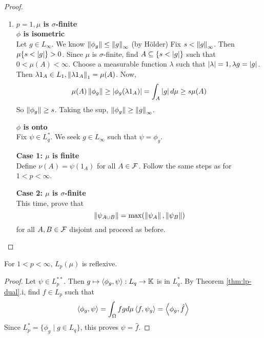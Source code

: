 \documentclass{article}
\begin{document}
\begin{proof}
\begin{enumerate}
    {\bf Case 3: General $n$} \\
    First observe that, for $f \in L_p(\mu)$, $\{f \ne 0\}$ is $\sigma$-finite. Indeed,
    $$\{f \ne 0\} = \Union_n \curlybrack{\frac 1n < \abs f}$$
    and
    $$\mu\curlybrack{\frac 1n < \abs f} \le \abs{n ^ p} \norm f_p^p < \infty \text{ by Markov}$$
    Choose $f_n \in B_{L_p}$ such that $\psi(f_n) \to \norm\psi$. Then $A = \Union_n\{f_n \ne 0\}$ is $\sigma$-finite and $\norm{\psi_A} = \norm\psi$. By the claim,
    $$\norm\psi = \left(\norm{\psi_A}^q + \norm{\psi_{A^c}}^q\right)^{\frac 1q}$$
    So $\Psi_{A^c} = 0$. By Case 2, find $g \in L_q(\mu_A) \subseteq L_q(\mu)$ such that $\psi_A = \phi_g$, so that
    $$\psi(f) = \psi_A{f\restriction_A} + \psi{A^c}(f\restriction{A^c}) = \int_A fg d\mu + 0 = \int_\Omega fg d\mu$$
    \item {\bf $p = 1, \mu$ is $\sigma$-finite} \\
    {\bf $\phi$ is isometric} \\
    Let $g \in L_\infty$. We know $\left\lVert \phi_g\right\rVert \le \left\lVert g\right\rVert_\infty$ (by Hölder) Fix $s < \left\lVert g\right\rVert_\infty$. Then $\mu\{s < \left\lvert g\right\rvert\} > 0$. Since $\mu$ is $\sigma$-finite, find $A \subseteq \{s < \left\lvert g\right\rvert\}$ such that $0 < \mu(A) < \infty$. Choose a measurable function $\lambda$ such that $\left\lvert \lambda\right\rvert = 1, \lambda g = \left\lvert g\right\rvert$. Then $\lambda 1_A \in L_1, \left\lVert \lambda 1_A\right\rVert_1 = \mu(A)$. Now,
    $$\mu(A)\left\lVert \phi_g\right\rVert \ge \left\lvert \phi_g(\lambda 1_A)\right\rvert = \int_A \left\lvert g\right\rvert d\mu \ge s\mu(A)$$
    So $\left\lVert \phi_g\right\rVert \ge s$. Taking the sup, $\left\lVert \phi_g\right\rVert \ge \left\lVert g\right\rVert_\infty$.

    {\bf $\phi$ is onto} \\
    Fix $\psi \in L_q^*$. We seek $g \in L_\infty$ such that $\psi = \phi_g$.

    {\bf Case 1: $\mu$ is finite} \\
    Define $\nu(A) = \psi(1_A)$ for all $A \in \mathcal F$. Follow the same steps as for $1 < p < \infty$.

    {\bf Case 2: $\mu$ is $\sigma$-finite} \\
    This time, prove that
    $$\left\lVert \psi_{A \cup B}\right\rVert = \max(\left\lVert \psi_A\right\rVert, \left\lVert \psi_B\right\rVert)$$
    for all $A, B \in \mathcal F$ disjoint and proceed as before.
  \end{enumerate}
\end{proof}

\begin{cor}
  For $1 < p < \infty$, $L_p(\mu)$ is reflexive.
\end{cor}
\begin{proof}
  Let $\psi \in L_p^{**}$. Then $g \mapsto \left\langle \phi_g, \psi\right\rangle : L_q \to \mathbb K$ is in $L_q^*$. By Theorem \ref{thm:lp-dual}.i, find $f \in L_p$ such that
  $$\left\langle \phi_g, \psi\right\rangle = \int_\Omega fg d\mu \left\langle f, \psi_g\right\rangle = \left\langle \phi_g, \hat f\right\rangle$$
  Since $L_p^* = \{\phi_g \mid g \in L_q\}$, this proves $\psi = \hat f$.
\end{proof}
\end{document}
